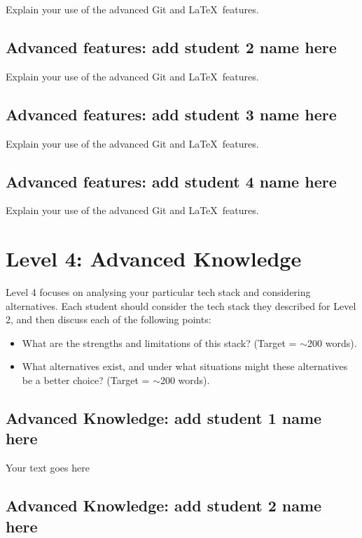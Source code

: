 \documentclass[a4paper, 11pt]{report}
\begin{document}
Explain your use of the advanced Git and \LaTeX\ features. 

\subsection{Advanced features: add student 2 name here}

Explain your use of the advanced Git and \LaTeX\ features. 

\subsection{Advanced features: add student 3 name here}

Explain your use of the advanced Git and \LaTeX\ features. 

\subsection{Advanced features: add student 4 name here}

Explain your use of the advanced Git and \LaTeX\ features. 




\newpage
\section{Level 4: Advanced Knowledge}

Level 4 focuses on analysing your particular tech stack and considering alternatives. Each student should consider the tech stack they described for Level 2, and then discuss each of the following points:
\begin{itemize}
    \item What are the strengths and limitations of this stack? (Target = $\sim$200 words).
    \item What alternatives exist, and under what situations might these alternatives be a better choice? (Target = $\sim$200 words).
\end{itemize}

\subsection{Advanced Knowledge: add student 1 name here}

Your text goes here

\subsection{Advanced Knowledge: add student 2 name here}
\end{document}
